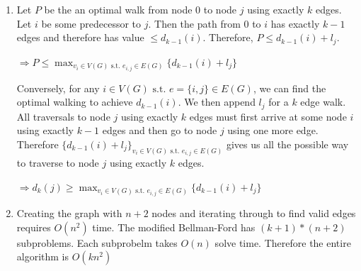 \documentclass[12pt]{article}
\newcounter{subproblem}
\newcommand{\st}{\text{ s.t. }}
\begin{document}
\begin{enumerate}
\begin{enumerate}
  \end{enumerate}

\item[(b)] Let $P$ be the an optimal walk from node $0$ to node $j$ using exactly $k$ edges. Let $i$ be some predecessor to $j$. Then the path from $0$ to $i$ has exactly $k-1$ edges and therefore has value $\leq d_{k-1}(i)$. Therefore, $P \leq d_{k-1}(i) + l_j$. 

$\Rightarrow P \leq \max_{v_i \in V(G) \st e_{i,j} \in E(G)} \{d_{k-1}(i) + l_{j}\}$

Conversely, for any $i \in V(G) \st e = \{i, j\} \in E(G)$, we can find the optimal walking to achieve $d_{k-1}(i)$. We then append $l_j$ for a $k$ edge walk. All traversals to node $j$ using exactly $k$ edges must first arrive at some node $i$ using exactly $k-1$ edges and then go to node $j$ using one more edge.  Therefore $\{d_{k-1}(i) + l_{j}\}_{v_i \in V(G) \st e_{i,j} \in E(G)}$ gives us all the possible way to traverse to node $j$ using exactly $k$ edges. 

$\Rightarrow d_k(j) \geq \max_{v_i \in V(G) \st e_{i,j} \in E(G)} \{d_{k-1}(i) + l_{j}\}$

\item[(c)] Creating the graph with $n+2$ nodes and iterating through to find valid edges requires $O(n^2)$ time. The modified Bellman-Ford has $ (k+1) * (n+2)$ subproblems. Each subprobelm takes $O(n)$ solve time. Therefore the entire algorithm is $O(kn^2)$
\end{enumerate}
\end{document}
